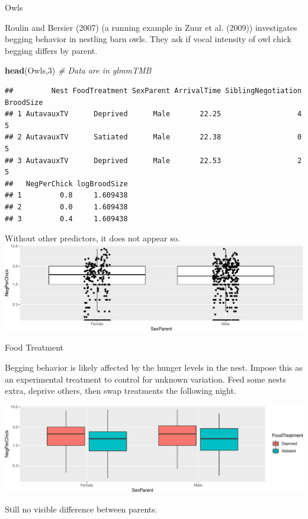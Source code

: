 \documentclass[
  ignorenonframetext,
]{beamer}
\newenvironment{Shaded}{\begin{snugshade}}{\end{snugshade}}
\newcommand{\CommentTok}[1]{\textcolor[rgb]{0.56,0.35,0.01}{\textit{#1}}}
\newcommand{\DecValTok}[1]{\textcolor[rgb]{0.00,0.00,0.81}{#1}}
\newcommand{\KeywordTok}[1]{\textcolor[rgb]{0.13,0.29,0.53}{\textbf{#1}}}
\newcommand{\NormalTok}[1]{#1}
\begin{document}
\begin{frame}[fragile]{Owls}
\protect\hypertarget{owls}{}

Roulin and Bersier (2007) (a running example in Zuur et al. (2009))
investigates begging behavior in nestling barn owls. They ask if vocal
intensity of owl chick begging differs by parent.

\tiny

\begin{Shaded}
\begin{Highlighting}[]
\KeywordTok{head}\NormalTok{(Owls,}\DecValTok{3}\NormalTok{) }\CommentTok{# Data are in glmmTMB}
\end{Highlighting}
\end{Shaded}

\begin{verbatim}
##         Nest FoodTreatment SexParent ArrivalTime SiblingNegotiation BroodSize
## 1 AutavauxTV      Deprived      Male       22.25                  4         5
## 2 AutavauxTV      Satiated      Male       22.38                  0         5
## 3 AutavauxTV      Deprived      Male       22.53                  2         5
##   NegPerChick logBroodSize
## 1         0.8     1.609438
## 2         0.0     1.609438
## 3         0.4     1.609438
\end{verbatim}

\normalsize

Without other predictors, it does not appear so.
\includegraphics{mixed_models_files/figure-beamer/unnamed-chunk-3-1.pdf}

\end{frame}

\begin{frame}{Food Treatment}
\protect\hypertarget{food-treatment}{}

Begging behavior is likely affected by the hunger levels in the nest.
Impose this as an experimental treatment to control for unknown
variation. Feed some nests extra, deprive others, then swap treatments
the following night.

\includegraphics{mixed_models_files/figure-beamer/unnamed-chunk-4-1.pdf}

Still no visible difference between parents.

\end{frame}
\end{document}
